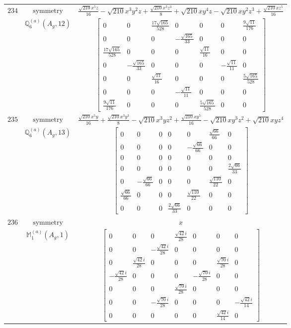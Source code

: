 \documentclass[fleqn,8pt,landscape]{jsarticle}
\begin{document}
\begin{longtable}{ccc}
$ 234 $ & $ \text{symmetry} $ & $ \frac{\sqrt{210} x^{5} z}{16} - \sqrt{210} x^{3} y^{2} z + \frac{\sqrt{210} x^{3} z^{3}}{8} + \sqrt{210} x y^{4} z - \sqrt{210} x y^{2} z^{3} + \frac{\sqrt{210} x z^{5}}{16} $ \\
$  $ & $ \mathbb{Q}_{6}^{(a)}(A_{g},12) $ & $ \begin{bmatrix} 0 & 0 & \frac{17 \sqrt{165}}{528} & 0 & 0 & 0 & \frac{9 \sqrt{11}}{176} \\ 0 & 0 & 0 & - \frac{\sqrt{165}}{33} & 0 & 0 & 0 \\ \frac{17 \sqrt{165}}{528} & 0 & 0 & 0 & \frac{\sqrt{11}}{16} & 0 & 0 \\ 0 & - \frac{\sqrt{165}}{33} & 0 & 0 & 0 & - \frac{\sqrt{11}}{11} & 0 \\ 0 & 0 & \frac{\sqrt{11}}{16} & 0 & 0 & 0 & \frac{5 \sqrt{165}}{528} \\ 0 & 0 & 0 & - \frac{\sqrt{11}}{11} & 0 & 0 & 0 \\ \frac{9 \sqrt{11}}{176} & 0 & 0 & 0 & \frac{5 \sqrt{165}}{528} & 0 & 0 \end{bmatrix} $ \\ \hline
$ 235 $ & $ \text{symmetry} $ & $ \frac{\sqrt{210} x^{5} y}{16} + \frac{\sqrt{210} x^{3} y^{3}}{8} - \sqrt{210} x^{3} y z^{2} + \frac{\sqrt{210} x y^{5}}{16} - \sqrt{210} x y^{3} z^{2} + \sqrt{210} x y z^{4} $ \\
$  $ & $ \mathbb{Q}_{6}^{(a)}(A_{g},13) $ & $ \begin{bmatrix} 0 & 0 & 0 & 0 & 0 & \frac{\sqrt{66}}{66} & 0 \\ 0 & 0 & 0 & 0 & - \frac{\sqrt{66}}{66} & 0 & 0 \\ 0 & 0 & 0 & 0 & 0 & 0 & 0 \\ 0 & 0 & 0 & 0 & 0 & 0 & \frac{2 \sqrt{66}}{33} \\ 0 & - \frac{\sqrt{66}}{66} & 0 & 0 & 0 & \frac{\sqrt{110}}{22} & 0 \\ \frac{\sqrt{66}}{66} & 0 & 0 & 0 & \frac{\sqrt{110}}{22} & 0 & 0 \\ 0 & 0 & 0 & \frac{2 \sqrt{66}}{33} & 0 & 0 & 0 \end{bmatrix} $ \\ \hline
$ 236 $ & $ \text{symmetry} $ & $ x $ \\
$  $ & $ \mathbb{M}_{1}^{(a)}(A_{g},1) $ & $ \begin{bmatrix} 0 & 0 & 0 & \frac{\sqrt{42} i}{28} & 0 & 0 & 0 \\ 0 & 0 & - \frac{\sqrt{42} i}{28} & 0 & 0 & 0 & 0 \\ 0 & \frac{\sqrt{42} i}{28} & 0 & 0 & 0 & \frac{\sqrt{70} i}{28} & 0 \\ - \frac{\sqrt{42} i}{28} & 0 & 0 & 0 & - \frac{\sqrt{70} i}{28} & 0 & 0 \\ 0 & 0 & 0 & \frac{\sqrt{70} i}{28} & 0 & 0 & 0 \\ 0 & 0 & - \frac{\sqrt{70} i}{28} & 0 & 0 & 0 & - \frac{\sqrt{42} i}{14} \\ 0 & 0 & 0 & 0 & 0 & \frac{\sqrt{42} i}{14} & 0 \end{bmatrix} $ \\ \hline

\end{longtable}
\end{document}
